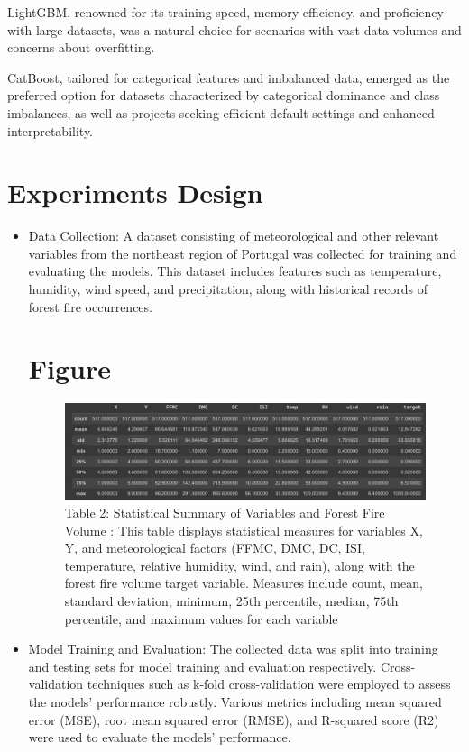 LightGBM, renowned for its training speed, memory efficiency, and proficiency with large datasets, was a natural choice for scenarios with vast data volumes and concerns about overfitting. 

CatBoost, tailored for categorical features and imbalanced data, emerged as the preferred option for datasets characterized by categorical dominance and class imbalances, as well as projects seeking
efficient default settings and enhanced interpretability.


\section {Experiments Design}
\begin{itemize}
\item Data Collection:
A dataset consisting of meteorological and other relevant variables from the northeast region of Portugal was collected for training and evaluating the models. This dataset includes features such as
temperature, humidity, wind speed, and precipitation, along with historical records of forest fire occurrences.

\section{Figure}
\begin{figure}[ht]
    \centering
    \includegraphics[scale=0.5]{figures/Statistical Summary.jpg}
    \caption{Table 2: Statistical Summary of Variables and
    Forest Fire Volume : This table displays statistical measures for variables X, Y, and meteorological factors (FFMC, DMC, DC, ISI, temperature, relative humidity, wind, and rain), along with the forest fire volume target variable. Measures include count, mean, standard deviation, minimum, 25th percentile, median, 75th percentile, and maximum values for each variable}
\end{figure}

\item Model Training and Evaluation:
The collected data was split into training and testing sets for model training and evaluation respectively. Cross-validation techniques such as k-fold cross-validation were employed to assess
the models' performance robustly. Various metrics including mean squared error (MSE), root mean squared error (RMSE), and R-squared score (R2) were used to evaluate the models' performance.


\end{itemize}
